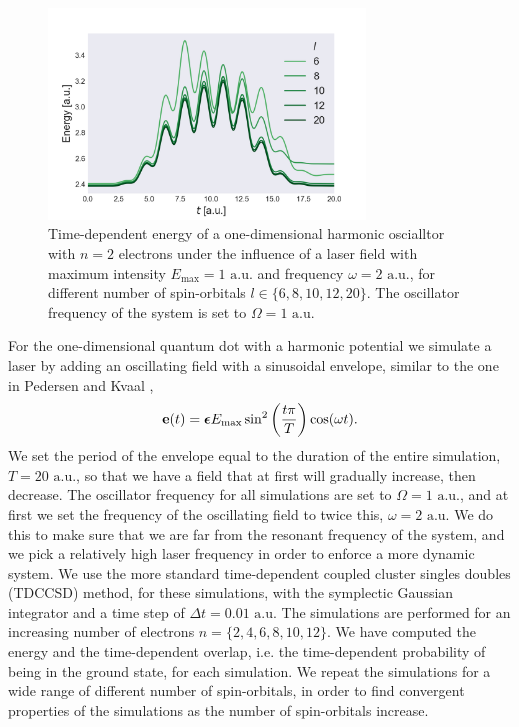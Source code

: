 \begin{figure}
    \centering
    \includegraphics[width=0.75\textwidth]{results/figures/1D/n=2energy.png} 
    \caption{Time-dependent energy of a one-dimensional harmonic oscialltor 
        with $n=2$ electrons
        under the influence of a laser field with maximum intensity $E_\text{max} = 1 \text{ a.u.}$
        and frequency $\omega = 2 \text{ a.u.}$, for different number of spin-orbitals
        $l\in\{6,8,10,12,20\}$. The oscillator frequency of the system is set to
        $\Omega = 1 \text{ a.u.}$
    }
    \label{fig:1d_n2_E}
\end{figure}

For the one-dimensional quantum dot with a harmonic potential we simulate a laser by 
adding an oscillating 
field with a sinusoidal envelope, similar to the one in
Pedersen and Kvaal \cite{pedersen2019symplectic},
\begin{equation}
    \label{eq:results_1d_field}
    \vb{e}(t) = \boldsymbol{\epsilon} E_\text{max}\sin^2\left(\frac{t\pi}{T}\right)\cos(\omega t).
\end{equation}
We set the period of the envelope equal to the duration of the entire simulation,
$T=20 \text{ a.u.}$, so that we have a field that at first will gradually increase, then decrease.
The oscillator frequency for all simulations are set to $\Omega=1 \text{ a.u.}$, and at first we 
set the frequency of the oscillating field to twice this, $\omega = 2 \text{ a.u.}$ We do this 
to make sure that we are far from the resonant frequency of the system, and we pick 
a relatively high laser frequency in order to enforce a more dynamic system. We use the 
more standard time-dependent coupled cluster singles doubles (TDCCSD) method, for 
these simulations, with the symplectic Gaussian integrator and a time step of
$\Delta t=0.01 \text{ a.u.}$
The simulations are performed for an increasing number of electrons
$n = \{2,4,6,8,10,12\}$. We have computed the energy and the time-dependent overlap,
i.e. the time-dependent probability of being in the ground state, for each simulation.
We repeat the simulations for a wide range of different number of spin-orbitals,
in order to find convergent properties of the simulations as the number of spin-orbitals increase.


